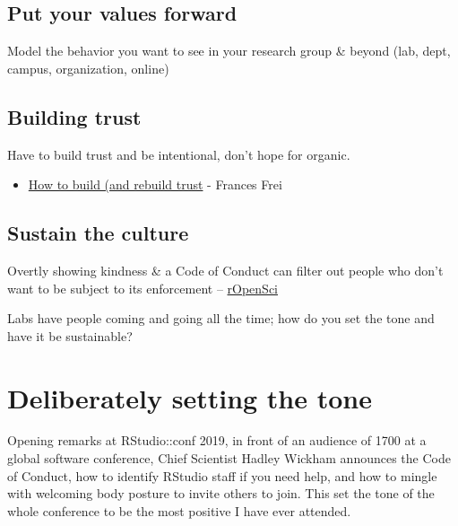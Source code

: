 \documentclass[
  letterpaper,
  DIV=11,
  numbers=noendperiod]{scrreprt}
\providecommand{\tightlist}{%
  \setlength{\itemsep}{0pt}\setlength{\parskip}{0pt}}
\begin{document}
\hypertarget{put-your-values-forward}{%
\subsection{Put your values forward}\label{put-your-values-forward}}

Model the behavior you want to see in your research group \& beyond
(lab, dept, campus, organization, online)

\hypertarget{building-trust}{%
\subsection{Building trust}\label{building-trust}}

Have to build trust and be intentional, don't hope for organic.

\begin{itemize}
\tightlist
\item
  \href{https://www.ted.com/talks/frances_frei_how_to_build_and_rebuild_trust?language=en}{How
  to build (and rebuild trust} - Frances Frei
\end{itemize}

\hypertarget{sustain-the-culture}{%
\subsection{Sustain the culture}\label{sustain-the-culture}}

Overtly showing kindness \& a Code of Conduct can filter out people who
don't want to be subject to its enforcement --
\href{https://ropensci.org/blog/2016/12/21/commcallv12-review-coc/}{rOpenSci}

Labs have people coming and going all the time; how do you set the tone
and have it be sustainable?

\hypertarget{deliberately-setting-the-tone}{%
\section{Deliberately setting the
tone}\label{deliberately-setting-the-tone}}

Opening remarks at RStudio::conf 2019, in front of an audience of 1700
at a global software conference, Chief Scientist Hadley Wickham
announces the Code of Conduct, how to identify RStudio staff if you need
help, and how to mingle with welcoming body posture to invite others to
join. This set the tone of the whole conference to be the most positive
I have ever attended.
\end{document}
